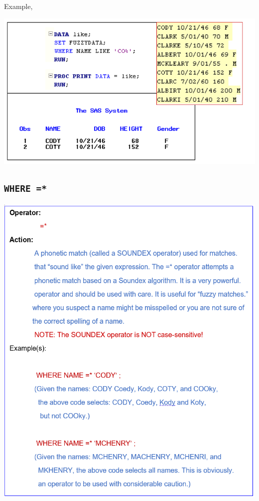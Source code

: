 \documentclass[
]{book}
\begin{document}
Example,

\begin{center}\includegraphics[width=1\linewidth]{img09/w09-LIKE-EXP} \end{center}

\hypertarget{where}{%
\subsection{\texorpdfstring{\texttt{WHERE\ =*}}{WHERE =*}}\label{where}}

\begin{center}\includegraphics[width=1\linewidth]{img09/w09-WHERE-SOUND} \end{center}
\end{document}
